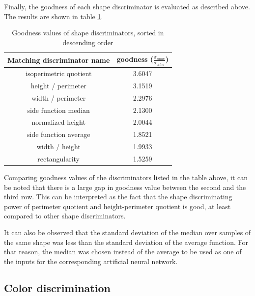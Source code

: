 \documentclass[times, utf8, zavrsni]{fer}
\begin{document}
Finally, the goodness of each shape discriminator is evaluated as described
above. The results are shown in table
\ref{table:shape-discriminators-goodnesses}.

\begin{table}[h]
\begin{center} {\footnotesize
\begin{tabular}{c|c}
Matching discriminator name & goodness
($\frac{\sigma_{same}}{\sigma_{other}}$) \\
\hline
isoperimetric quotient          &                    3.6047 \\
height / perimeter              &                    3.1519 \\
width / perimeter               &                    2.2976 \\
side function median            &                    2.1300 \\
normalized height               &                    2.0044 \\
side function average           &                    1.8521 \\
width / height                  &                    1.9933 \\
rectangularity                  &                    1.5259 \\
\end{tabular} }
\end{center}
\caption{\footnotesize Goodness values of shape discriminators, sorted in
descending order}
\label{table:shape-discriminators-goodnesses}
\end{table}

Comparing goodness values of the discriminators listed in the table above, it 
can be noted that there is a large gap in goodness value between the second and
the third row. This can be interpreted as the fact that the
shape discriminating power of perimeter quotient and height-perimeter quotient
is good, at least compared to other shape discriminators.

It can also be observed that the standard deviation of the median over samples
of the same shape was less than the standard deviation of the average function. For
that reason, the median was chosen instead of the average to be used as one of
the inputs for the corresponding artificial neural network.


\subsection{Color discrimination}
\end{document}
